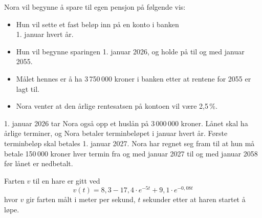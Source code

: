 \newpage
{}
Nora vil begynne å spare til egen pensjon på følgende vis:
\begin{itemize}
	\item Hun vil sette et fast beløp inn på en konto i banken\\ 1. januar hvert år. 
	\item Hun vil begynne sparingen 1. januar 2026, og holde på til og med januar 2055.
	\item Målet hennes er å ha 3\,750\,000 kroner i banken etter at rentene for 2055 er lagt til. 
	\item Nora venter at den årlige rentesatsen på kontoen vil være 2,5\,\%.
\end{itemize}
1. januar 2026 tar Nora også opp et huslån på 3\,000\,000 kroner. Lånet skal ha årlige terminer, og Nora betaler terminbeløpet i januar hvert år. Første terminbeløp skal betales 1. januar 2027.
Nora har regnet seg fram til at hun må betale 150\,000 kroner hver termin fra og med januar 2027 til og med januar 2058 før lånet er nedbetalt.

\newpage
{}
Farten $v$ til en hare er gitt ved	
\[ v(t) = 8,3 - 17,4 \cdot e^{-5t} + 9,1 \cdot e^{-0,08t} \]
hvor $v$ gir farten målt i meter per sekund, $t$ sekunder etter at haren startet å løpe.

